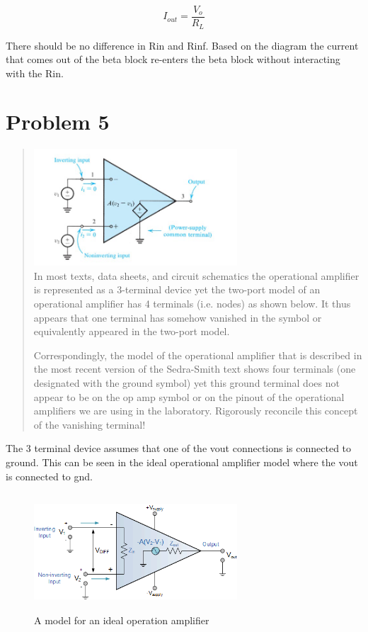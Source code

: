 \documentclass[10pt,a4paper]{article}
\begin{document}
\begin{equation}
\label{eq:VOUT}
I_{out} = \frac{V_{o}}{R_L}
\end{equation}


There should be no difference in Rin and Rinf. Based on the diagram the current that comes out of the beta block re-enters the beta block without interacting with the Rin.  

\section{Problem 5}
\begin{quote}
\includegraphics[width=2.99028in,height=1.71667in]{vertopal_3376d9a0695b4078a59040ba2f51c60d/media/image5.png}\\
In most texts, data sheets, and circuit schematics the
operational amplifier is represented as a 3-terminal device yet the
two-port model of an operational amplifier has 4 terminals (i.e. nodes)
as shown below. It thus appears that one terminal has somehow vanished
in the symbol or equivalently appeared in the two-port model.

Correspondingly, the model of the operational amplifier that is
described in the most recent version of the Sedra-Smith text shows four
terminals (one designated with the ground symbol) yet this ground
terminal does not appear to be on the op amp symbol or on the pinout of
the operational amplifiers we are using in the laboratory. Rigorously
reconcile this concept of the vanishing terminal!
\end{quote}

The 3 terminal device assumes that one of the vout connections is connected to ground. This can be seen in the ideal operational amplifier model where the vout is connected to gnd.\\

\begin{figure}[H]
\centering
\includegraphics[width=2.99028in,height=1.71667in]{images/opamp1.png}
\caption{A model for an ideal operation amplifier\cite{opamp-pics}}
\end{figure}
\end{document}
